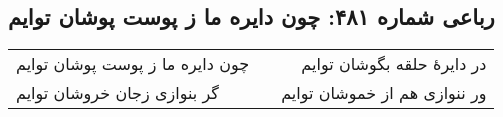 \begin{center}
\section*{رباعی شماره ۴۸۱: چون دایره ما ز پوست پوشان توایم}
\label{sec:sh481}
\begin{longtable}{l p{0.5cm} r}
چون دایره ما ز پوست پوشان توایم
&&
در دایرهٔ حلقه بگوشان توایم
\\
گر بنوازی زجان خروشان توایم
&&
ور ننوازی هم از خموشان توایم
\\
\end{longtable}
\end{center}

